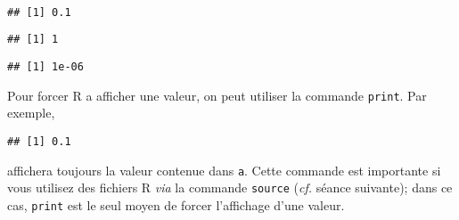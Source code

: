 \begin{knitrout}
\color{fgcolor}\begin{kframe}
\begin{flushleft}
\ttfamily\noindent
{}\hlassignement{\usebox{\hlnormalsizeboxlessthan}-}{\ }\hspace*{\fill}\\
\hlstd{}\hlassignement{\usebox{\hlnormalsizeboxlessthan}-}{\ }\hspace*{\fill}\\
\hlstd{}\hlassignement{\usebox{\hlnormalsizeboxlessthan}-}{\ }\hspace*{\fill}\\
\hlstd{}\mbox{}
\normalfont
\end{flushleft}
\begin{verbatim}
## [1] 0.1
\end{verbatim}
\begin{flushleft}
\ttfamily\noindent
{}\mbox{}
\normalfont
\end{flushleft}
\begin{verbatim}
## [1] 1
\end{verbatim}
\begin{flushleft}
\ttfamily\noindent
{}\mbox{}
\normalfont
\end{flushleft}
\begin{verbatim}
## [1] 1e-06
\end{verbatim}
\end{kframe}
\end{knitrout}


Pour forcer R a afficher une valeur, on peut utiliser la commande \texttt{print}. Par exemple,

\begin{knitrout}
\color{fgcolor}\begin{kframe}
\begin{flushleft}
\ttfamily\noindent
{}\hlkeyword{(}\hlkeyword{)}\mbox{}
\normalfont
\end{flushleft}
\begin{verbatim}
## [1] 0.1
\end{verbatim}
\end{kframe}
\end{knitrout}


\noindent affichera toujours la valeur contenue dans \texttt{a}.
Cette commande est importante si vous utilisez des fichiers R \emph{via} la commande \texttt{source} (\emph{cf.} séance suivante);
dans ce cas, \texttt{print} est le seul moyen de forcer l'affichage d'une valeur.

